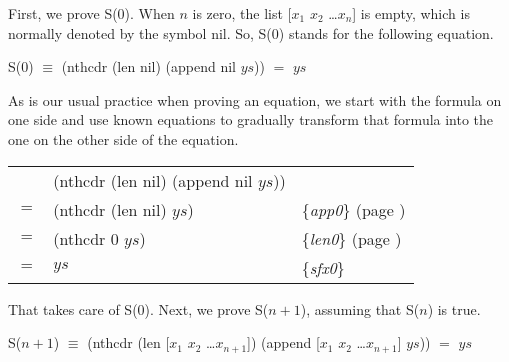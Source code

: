 First, we prove S(0).
When $n$ is zero, the list [$x_1$ $x_2$ \dots $x_n$] is empty,
which is normally denoted by the symbol nil.
So, S(0) stands for the following equation.

\begin{samepage}
\begin{center}
S(0) $\equiv$ (nthcdr (len nil) (append nil $ys$)) $=$ $ys$
\end{center}
\end{samepage}


As is our usual practice when proving an equation,
we start with the formula on one side and use known
equations to gradually transform that formula
into the one on the other side of the equation.

\begin{center}
\begin{tabular}{lll}
    & (nthcdr (len nil) (append nil $ys$))  &                                                  \\
$=$ & (nthcdr (len nil) $ys$)               & \{\emph{app0}\} (page \pageref{fig:append-defun})\\
$=$ & (nthcdr 0 $ys$)                       & \{\emph{len0}\} (page \pageref{len-equations})   \\
$=$ & $ys$                                  & \{\emph{sfx0}\}                                  \\
\end{tabular}
\end{center}

That takes care of S(0). Next, we prove S($n+1$), assuming that S($n$) is true.

\begin{samepage}
\begin{center}
S($n+1$) $\equiv$ (nthcdr (len [$x_1$ $x_2$ \dots $x_{n+1}$]) (append [$x_1$ $x_2$ \dots $x_{n+1}$] $ys$)) $=$ $ys$
\end{center}
\end{samepage}

